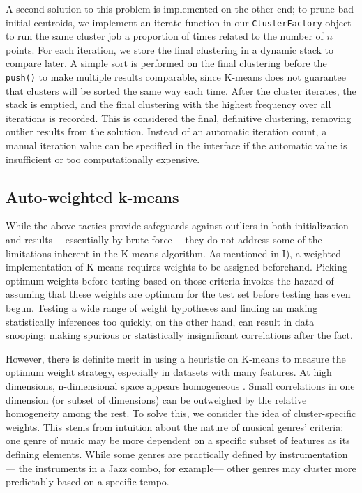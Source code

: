 \documentclass[12pt,twocolumn,titlepage]{article}
\begin{document}
A second solution to this problem is implemented on the other end; to prune bad initial centroids, we implement an iterate function in our \texttt{ClusterFactory} object to run the same cluster job a proportion of times related to the number of $n$ points. For each iteration, we store the final clustering in a dynamic stack to compare later. A simple sort is performed on the final clustering before the \texttt{push()} to make multiple results comparable, since K-means does not guarantee that clusters will be sorted the same way each time. After the cluster iterates, the stack is emptied, and the final clustering with the highest frequency over all iterations is recorded. This is considered the final, definitive clustering, removing outlier results from the solution. Instead of an automatic iteration count, a manual iteration value can be specified in the interface if the automatic value is insufficient or too computationally expensive.

\subsection{Auto-weighted k-means}

While the above tactics provide safeguards against outliers in both initialization and results— essentially by brute force— they do not address some of the limitations inherent in the K-means algorithm. As mentioned in I), a weighted implementation of K-means requires weights to be assigned beforehand. Picking optimum weights before testing based on those criteria invokes the hazard of assuming that these weights are optimum for the test set before testing has even begun. Testing a wide range of weight hypotheses and finding an making statistically inferences too quickly, on the other hand, can result in data snooping: making spurious or statistically insignificant correlations after the fact.


However, there is definite merit in using a heuristic on K-means to measure the optimum weight strategy, especially in datasets with many features. At high dimensions, n-dimensional space appears homogeneous \cite{KumarErtoz}.  Small correlations in one dimension (or subset of dimensions) can be outweighed by the relative homogeneity among the rest. To solve this, we consider the idea of cluster-specific weights. This stems from intuition about the nature of musical genres' criteria: one genre of music may be more dependent on a specific subset of features as its defining elements. While some genres are practically defined by instrumentation— the instruments in a Jazz combo, for example— other genres may cluster more predictably based on a specific tempo. 
\end{document}
